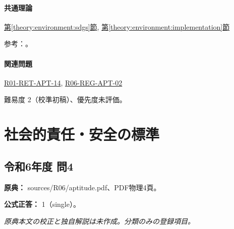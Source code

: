 \paragraph{共通理論} \hyperref[theory:environment:sdgs]{第\ref*{theory:environment:sdgs}節}, \hyperref[theory:environment:implementation]{第\ref*{theory:environment:implementation}節}

\par 参考：\cite{env_sdgs_pamphlet,env_humansecurity}。

\paragraph{関連問題} \hyperref[q:r01-ret-apt-14]{R01-RET-APT-14}, \hyperref[q:r06-reg-apt-02]{R06-REG-APT-02}

\par 難易度 2（校準初稿）、優先度未評価。

\section{社会的責任・安全の標準}

\subsection{令和6年度 問4}
\label{q:r06-reg-apt-04}

\noindent\textbf{原典：} sources/R06/aptitude.pdf、PDF物理4頁。

\textbf{公式正答：} 1（single）。

\par\textit{原典本文の校正と独自解説は未作成。分類のみの登録項目。}
